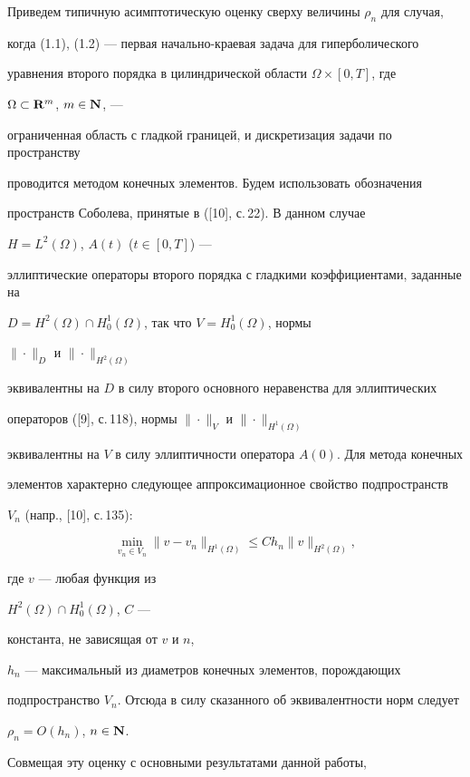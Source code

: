 Приведем типичную асимптотическую оценку сверху величины $\rho_n$ для случая,


когда (1.1), (1.2) --- первая начально-краевая задача для гиперболического


уравнения второго порядка в цилиндрической области $\Omega\times[0,T]$, где


$\Omega\subset{\bold R^m}$, $m\in{\bold N}$, ---


ограниченная область с гладкой границей, и дискретизация задачи по пространству


проводится методом конечных элементов. Будем использовать обозначения


пространств Соболева, принятые в ([10], с.\,22). В данном случае


$H=L^2(\Omega)$, $A(t)$ ($t\in[0,T]$) ---


эллиптические операторы второго порядка с гладкими коэффициентами, заданные на


$D=H^2(\Omega)\cap H_0^1(\Omega)$, так что $V=H_0^1(\Omega)$, нормы


$\|\cdot\|_D$ и $\|\cdot\|_{H^2(\Omega)}$


эквивалентны на $D$ в силу второго основного неравенства для эллиптических


операторов ([9], с.\,118), нормы $\|\cdot\|_V$ и $\|\cdot\|_{H^1(\Omega)}$


эквивалентны на $V$ в силу эллиптичности оператора $A(0)$. Для метода конечных


элементов характерно следующее аппроксимационное свойство подпространств


$V_n$ (напр., [10], с.\,135):


$$


\min\limits_{v_n\in V_n}\|v-v_n\|_{H^1(\Omega)}\le


Ch_n\|v\|_{H^2(\Omega)},


$$


где $v$ --- любая функция из


$H^2(\Omega)\cap H_0^1(\Omega)$, $C$ ---


константа, не зависящая от $v$ и $n$,


$h_n$ --- максимальный из диаметров конечных элементов, порождающих


подпространство $V_n$. Отсюда в силу сказанного об эквивалентности норм следует


$\rho_n={O}(h_n)$, $n\in{\bold N}$.


Совмещая эту оценку с основными результатами данной работы,


